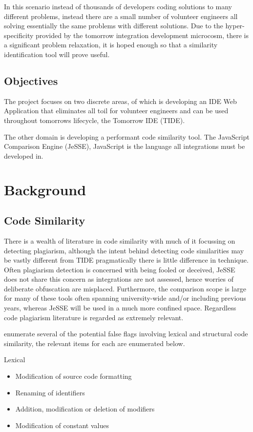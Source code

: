 \documentclass[jou,apacite]{apa6}
\begin{document}
In this scenario instead of thousands of developers coding solutions to many different problems, instead there are a small number of volunteer engineers all solving essentially the same problems with different solutions. Due to the hyper-specificity provided by the tomorrow integration development microcosm, there is a significant problem relaxation, it is hoped enough so that a similarity identification tool will prove useful.

\subsection{Objectives}
The project focuses on two discrete areas, 
 of which is developing an IDE Web Application that eliminates all toil for volunteer engineers and can be used throughout tomorrow\textquotesingle s lifecycle, the Tomorrow IDE (TIDE).

The other domain is developing a performant code similarity tool. The JavaScript Comparison Engine (JeSSE), JavaScript is the language all integrations must be developed in.

\section{Background}
\subsection{Code Similarity}
There is a wealth of literature in code similarity with much of it focussing on detecting plagiarism, although the intent behind detecting code similarities may be vastly different from TIDE pragmatically there is little difference in technique. Often plagiarism detection is concerned with being fooled or deceived, JeSSE does not share this concern as integrations are not assessed,  hence worries of deliberate obfuscation are misplaced. Furthermore, the comparison scope is large for many of these tools often spanning university-wide and/or including previous years, whereas JeSSE will be used in a much more confined space. Regardless code plagiarism literature is regarded as extremely relevant.

\cite{Duric2013} enumerate several of the potential false flags involving lexical and structural code similarity, the relevant items for each are enumerated below.

Lexical
\begin{itemize}
  \setlength\itemsep{-0.5em}
  \item Modification of source code formatting 
  \item Renaming of identifiers
  \item Addition, modification or deletion of modifiers
  \item Modification of constant values
\end{itemize}
\end{document}

